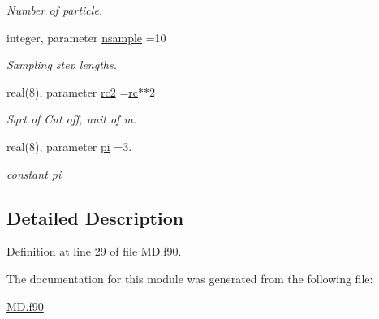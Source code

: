 \begin{DoxyCompactItemize}
\begin{DoxyCompactList}\small\item\em Number of particle. \end{DoxyCompactList}\item 
\hypertarget{classconstants_a5d456d30fa0d6e91108aec53d70dbd77}{}integer, parameter \hyperlink{classconstants_a5d456d30fa0d6e91108aec53d70dbd77}{nsample} =10\label{classconstants_a5d456d30fa0d6e91108aec53d70dbd77}

\begin{DoxyCompactList}\small\item\em Sampling step lengths. \end{DoxyCompactList}\item 
\hypertarget{classconstants_abcb9784673a5d2bd53ae1e743f223a53}{}real(8), parameter \hyperlink{classconstants_abcb9784673a5d2bd53ae1e743f223a53}{rc2} =\hyperlink{classconstants_a9cd98cf27bc4465f53949a06e914147e}{rc}$\ast$$\ast$2\label{classconstants_abcb9784673a5d2bd53ae1e743f223a53}

\begin{DoxyCompactList}\small\item\em Sqrt of Cut off, unit of m. \end{DoxyCompactList}\item 
\hypertarget{classconstants_a40554951c01f6d0ebdf12361ef72a2e7}{}real(8), parameter \hyperlink{classconstants_a40554951c01f6d0ebdf12361ef72a2e7}{pi} =3.\label{classconstants_a40554951c01f6d0ebdf12361ef72a2e7}

\begin{DoxyCompactList}\small\item\em constant pi \end{DoxyCompactList}\end{DoxyCompactItemize}


\subsection{Detailed Description}


Definition at line 29 of file M\+D.\+f90.



The documentation for this module was generated from the following file\+:\begin{DoxyCompactItemize}
\item 
\hyperlink{MD_8f90}{M\+D.\+f90}\end{DoxyCompactItemize}
